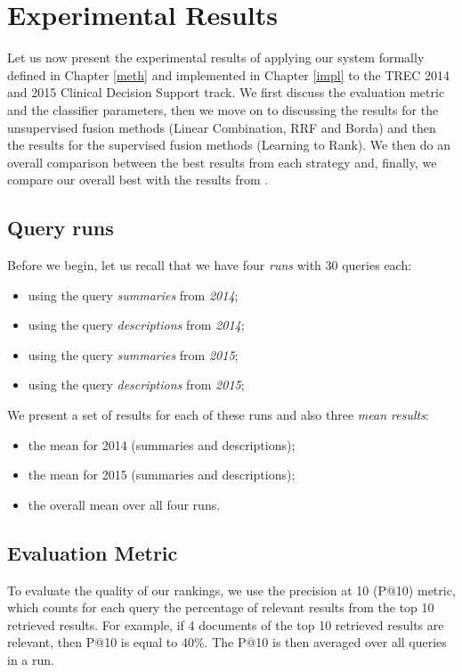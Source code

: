\chapter{Experimental Results}\label{exp}

Let us now present the experimental results of applying our system formally defined in Chapter \ref{meth} and implemented in Chapter 
\ref{impl}
to the TREC 2014 and 2015 Clinical Decision Support track.
We first discuss the evaluation metric and the classifier parameters,
then we move on to discussing the results for the unsupervised fusion methods (Linear Combination, RRF and Borda)
and then the results for the supervised fusion methods (Learning to Rank). We then do an overall comparison between the best results from each strategy
and, finally, we compare our overall best with the results from \cite{choi}.

\section{Query runs}\label{runs} Before we begin, let us recall that we have four \emph{runs} with 30 queries each:
\begin{itemize}
 \item using the query \emph{summaries} from \emph{2014};
 \item using the query \emph{descriptions} from \emph{2014};
 \item using the query \emph{summaries} from \emph{2015};
 \item using the query \emph{descriptions} from \emph{2015};
\end{itemize}

We present a set of results for each of these runs and also three \emph{mean results}:
\begin{itemize}
 \item the mean for 2014 (summaries and descriptions);
 \item the mean for 2015 (summaries and descriptions);
 \item the overall mean over all four runs.
\end{itemize}

\section{Evaluation Metric}
To evaluate the quality of our rankings, we use the precision at 10 (P@10) metric, which counts for each query the percentage of
relevant results from the top 10 retrieved results. For example, if 4 documents of the top 10 retrieved results are relevant,
then P@10 is equal to 40\%. The P@10 is then averaged over all queries in a run.

